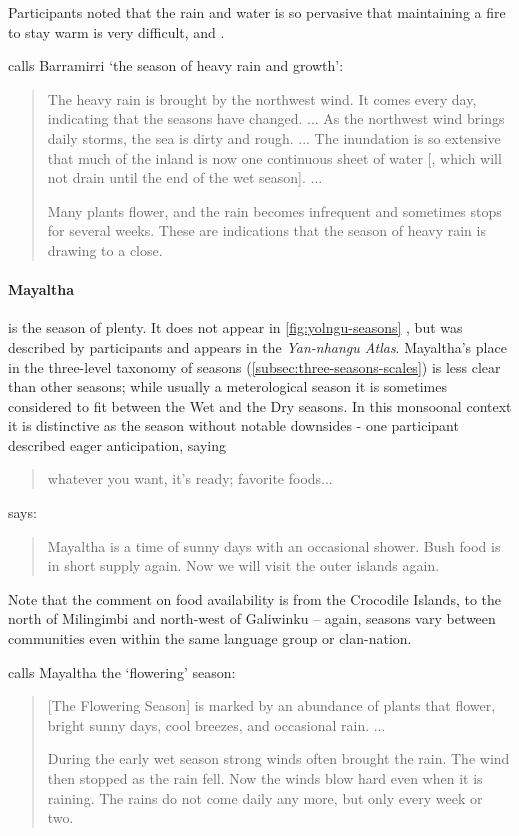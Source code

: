 Participants noted that the rain and water is so pervasive that maintaining
a fire to stay warm is very difficult, and .

\citet{davis1989} calls Barramirri `the season of heavy rain and growth':
\blockquote{
    The heavy rain is brought by the northwest wind. It comes every day,
    indicating that the seasons have changed. ...
    As the northwest wind brings daily storms, the sea is dirty and rough. ...
    The inundation is so extensive that much of the inland is now one continuous sheet of water
    [, which will not drain until the end of the wet season]. ...

    Many plants flower, and the rain becomes infrequent and sometimes stops for several weeks.
    These are indications that the season of heavy rain is drawing to a close.
}


\paragraph{Mayaltha} is the season of plenty.  It does not appear in
\cref{fig:yolngu-seasons} \citep{davis1989}, but was described by
participants and appears in the \textit{Yan-nhangu Atlas}.  Mayaltha's
place in the three-level taxonomy of seasons (\cref{subsec:three-seasons-scales})
is less clear than other seasons; while usually a meterological season
it is sometimes considered to fit between the Wet and the Dry seasons.
In this monsoonal context it is distinctive as the season without notable
downsides - one participant described eager anticipation, saying \blockquote{
    whatever you want, it's ready; favorite foods... 
}.

\citet[][p36]{atlas2014} says: \blockquote{
    Mayaltha is a time of sunny days with an occasional shower. Bush food
    is in short supply again.  Now we will visit the outer islands again.
}.  Note that the comment on food availability is from the Crocodile Islands,
to the north of Milingimbi and north-west of Galiwinku -- again, seasons
vary between communities even within the same language group or clan-nation.

\citet{davis1989} calls Mayaltha the `flowering' season:
\blockquote{
    [The Flowering Season] is marked by an abundance of plants that flower,
    bright sunny days, cool breezes, and occasional rain. ...

    During the early wet season strong winds often brought the rain.
    The wind then stopped as the rain fell.
    Now the winds blow hard even when it is raining.
    The rains do not come daily any more, but only every week or two.
}


